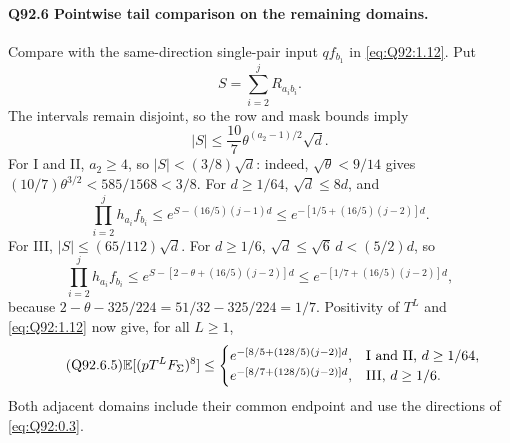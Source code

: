 \paragraph{Q92.6 Pointwise tail comparison on the remaining domains.}
Compare with the same-direction single-pair input \(qf_{b_1}\) in
\eqref{eq:Q92:1.12}. Put
\begin{equation}\tag{Q92.6.1}\label{eq:Q92:6.1}
S=\sum_{i=2}^jR_{a_ib_i}.
\end{equation}
The intervals remain disjoint, so the row and mask bounds imply
\begin{equation}\tag{Q92.6.2}\label{eq:Q92:6.2}
|S|\le\frac{10}{7}\theta^{(a_2-1)/2}\sqrt d.
\end{equation}
For I and II, \(a_2\ge\allowbreak 4\), so \(|S|<\allowbreak (3/8)\sqrt d\): indeed,
\(\sqrt\theta<\allowbreak 9/14\) gives
\((10/7)\theta^{3/2}<\allowbreak 585/1568<\allowbreak 3/8\).
For \(d\ge\allowbreak 1/64\), \(\sqrt d\le\allowbreak 8d\), and
\begin{equation}\tag{Q92.6.3}\label{eq:Q92:6.3}
\prod_{i=2}^jh_{a_i}f_{b_i}
\le e^{S-(16/5)(j-1)d}
\le e^{-[1/5+(16/5)(j-2)]d}.
\end{equation}
For III, \(|S|\le\allowbreak (65/112)\sqrt d\).
For \(d\ge\allowbreak 1/6\), \(\sqrt d\le\allowbreak \sqrt6\,\allowbreak d<\allowbreak (5/2)d\), so
\begin{equation}\tag{Q92.6.4}\label{eq:Q92:6.4}
\prod_{i=2}^jh_{a_i}f_{b_i}
\le e^{S-[2-\theta+(16/5)(j-2)]d}
\le e^{-[1/7+(16/5)(j-2)]d},
\end{equation}
because \(2-\theta-325/224=\allowbreak 51/32-325/224=\allowbreak 1/7\).
Positivity of \(T^L\) and \eqref{eq:Q92:1.12} now give, for all \(L\ge\allowbreak 1\),
\begin{equation}\tag{Q92.6.5}\label{eq:Q92:6.5}
\mathbb E[(pT^LF_\Sigma)^8]\le
\begin{cases}
e^{-[8/5+(128/5)(j-2)]d},&\text{I and II, }d\ge1/64,\\
e^{-[8/7+(128/5)(j-2)]d},&\text{III, }d\ge1/6.
\end{cases}
\end{equation}
Both adjacent domains include their common endpoint and use the directions
of \eqref{eq:Q92:0.3}.

